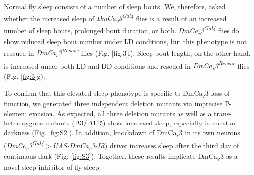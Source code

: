 Normal fly sleep consists of a number of sleep bouts.
We, therefore, asked whether the increased sleep of \emph{DmCa\textsubscript{v}3\textsuperscript{Gal4}} flies is a result of an increased number of sleep bouts, prolonged bout duration, or both.
\emph{DmCa\textsubscript{v}3\textsuperscript{Gal4}} flies do show reduced sleep bout number under LD conditions, but this phenotype is not rescued in \emph{DmCa\textsubscript{v}3\textsuperscript{Rescue}} flies (Fig. \ref{fig:3}f).
Sleep bout length, on the other hand, is increased under both LD and DD conditions and rescued in \emph{DmCa\textsubscript{v}3\textsuperscript{Rescue}} flies (Fig. \ref{fig:3}g).

To confirm that this elevated sleep phenotype is specific to DmCa\textsubscript{v}3 loss-of-function, we generated three independent deletion mutants via imprecise P-element excision.
As expected, all three deletion mutants as well as a trans-heterozygous mutants ($\Delta$3/$\Delta$115) show increased sleep, especially in constant darkness (Fig. \ref{fig:S2}).
In addition, knockdown of DmCa\textsubscript{v}3 in its own neurons (\emph{DmCa\textsubscript{v}3\textsuperscript{Gal4}$>$UAS-DmCa\textsubscript{v}3-IR}) driver increases sleep after the third day of continuous dark (Fig. \ref{fig:S3}).
Together, these results implicate DmCa\textsubscript{v}3 as a novel sleep-inhibitor of fly sleep.

  